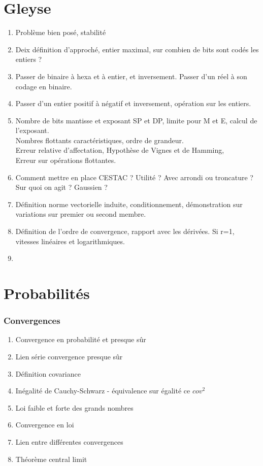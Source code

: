 \documentclass{article}
\begin{document}
\part{Gleyse}
\begin{enumerate}
	\item Problème bien posé, stabilité
	\item Deix définition d'approché, entier maximal, sur combien de bits sont codés les entiers ? 
	\item Passer de binaire à hexa et à entier, et inversement. Passer d'un réel à son codage en binaire.
	\item Passer d'un entier positif à négatif et inversement, opération sur les entiers.
	\item Nombre de bits mantisse et exposant SP et DP, limite pour M et E, calcul de l'exposant. \\
		Nombres flottants caractéristiques, ordre de grandeur. \\
		Erreur relative d'affectation, Hypothèse de Vignes et de Hamming, \\
		Erreur sur opérations flottantes.
	\item Comment mettre en place CESTAC ? Utilité ? Avec arrondi ou troncature ? Sur quoi on agit ? Gaussien ?
	\item Définition norme vectorielle induite, conditionnement, démonstration sur variations sur premier ou second membre.
	\item Définition de l'ordre de convergence, rapport avec les dérivées. Si r=1, vitesses linéaires et logarithmiques.
	\item 
\end{enumerate}

\newpage
\part{Probabilités}
\section{Convergences}
\begin{enumerate}
\item Convergence en probabilité et presque sûr
\item Lien série convergence presque sûr
\item Définition covariance
\item Inégalité de Cauchy-Schwarz - équivalence sur égalité ce $cov^2$
\item Loi faible et forte des grands nombres
\item Convergence en loi
\item Lien entre différentes convergences
\item Théorème central limit
\end{enumerate}
\end{document}
